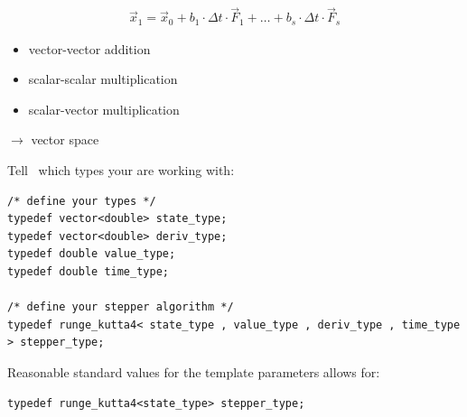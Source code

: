 \begin{frame}
\begin{align*}
  \vec x_1 = \vec x_0 + b_1\cdot \Delta t \cdot \vec F_1 + \dots + b_s\cdot \Delta t \cdot \vec F_s
\end{align*}

\begin{itemize}
 \item vector-vector addition
 \item scalar-scalar multiplication
 \item scalar-vector multiplication
\end{itemize}
\vspace{2ex}
\centerline{\small $\longrightarrow$ vector space}

\end{frame}


\begin{frame}[fragile]

Tell \odeint\ which types your are working with:

\begin{lstlisting}
/* define your types */
typedef vector<double> state_type;
typedef vector<double> deriv_type;
typedef double value_type;
typedef double time_type;

/* define your stepper algorithm */
typedef runge_kutta4< state_type , value_type , deriv_type , time_type > stepper_type;
\end{lstlisting}

Reasonable standard values for the template parameters allows for:

\begin{lstlisting}
typedef runge_kutta4<state_type> stepper_type;
\end{lstlisting}


\end{frame}



